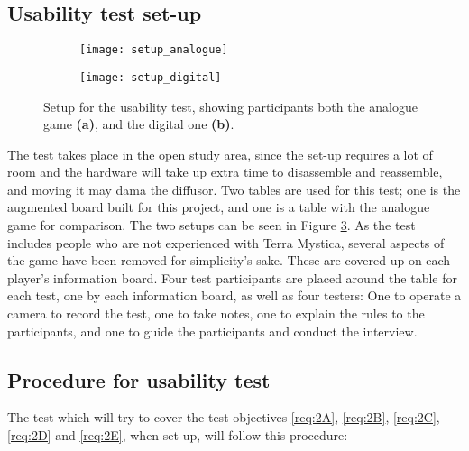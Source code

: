 \subsection{Usability test set-up}
\begin{figure}[!h]
	\centering
	\begin{subfigure}[b]{0.4\textwidth}
	\texttt{[image: setup\_analogue]}
		\caption{\label{Fig:SetupAna}}
	\end{subfigure}
	\begin{subfigure}[b]{0.4\textwidth}
	\texttt{[image: setup\_digital]}
		\caption{\label{Fig:SetupDigi}}
	\end{subfigure}
	\caption{Setup for the usability test, showing participants both the analogue game \textbf{(a)}, and the digital one \textbf{(b)}.\label{Fig:Setup}}
\end{figure}
The test takes place in the open study area, since the set-up requires a lot of room and the hardware will take up extra time to disassemble and reassemble, and moving it may dama the diffusor. Two tables are used for this test; one is the augmented board built for this project, and one is a table with the analogue game for comparison. The two setups can be seen in Figure \ref{Fig:Setup}. As the test includes people who are not experienced with Terra Mystica, several aspects of the game have been removed for simplicity's sake. These are covered up on each player's information board. Four test participants are placed around the table for each test, one by each information board, as well as four testers: One to operate a camera to record the test, one to take notes, one to explain the rules to the participants, and one to guide the participants and conduct the interview.

\subsection{Procedure for usability test}
The test which will try to cover the test objectives \ref{req:2A}, \ref{req:2B}, \ref{req:2C}, \ref{req:2D} and \ref{req:2E}, when set up, will follow this procedure:

